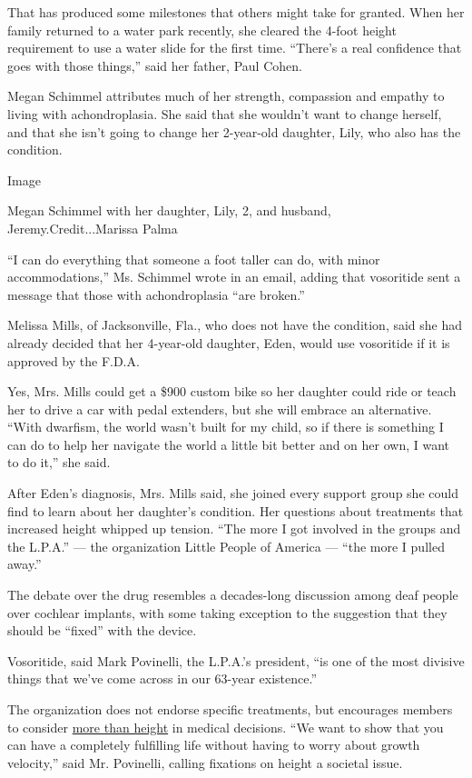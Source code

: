 That has produced some milestones that others might take for granted.
When her family returned to a water park recently, she cleared the
4-foot height requirement to use a water slide for the first time.
``There's a real confidence that goes with those things,'' said her
father, Paul Cohen.

Megan Schimmel attributes much of her strength, compassion and empathy
to living with achondroplasia. She said that she wouldn't want to change
herself, and that she isn't going to change her 2-year-old daughter,
Lily, who also has the condition.

Image

Megan Schimmel with her daughter, Lily, 2, and husband,
Jeremy.Credit...Marissa Palma

``I can do everything that someone a foot taller can do, with minor
accommodations,'' Ms. Schimmel wrote in an email, adding that vosoritide
sent a message that those with achondroplasia ``are broken.''

Melissa Mills, of Jacksonville, Fla., who does not have the condition,
said she had already decided that her 4-year-old daughter, Eden, would
use vosoritide if it is approved by the F.D.A.

Yes, Mrs. Mills could get a \$900 custom bike so her daughter could ride
or teach her to drive a car with pedal extenders, but she will embrace
an alternative. ``With dwarfism, the world wasn't built for my child, so
if there is something I can do to help her navigate the world a little
bit better and on her own, I want to do it,'' she said.

After Eden's diagnosis, Mrs. Mills said, she joined every support group
she could find to learn about her daughter's condition. Her questions
about treatments that increased height whipped up tension. ``The more I
got involved in the groups and the L.P.A.'' --- the organization Little
People of America --- ``the more I pulled away.''

The debate over the drug resembles a decades-long discussion among deaf
people over cochlear implants, with some taking exception to the
suggestion that they should be ``fixed'' with the device.

Vosoritide, said Mark Povinelli, the L.P.A.'s president, ``is one of the
most divisive things that we've come across in our 63-year existence.''

The organization does not endorse specific treatments, but encourages
members to consider
\href{https://www.lpaonline.org/genetic-biotechnology-research-position-statement}{more
than height} in medical decisions. ``We want to show that you can have a
completely fulfilling life without having to worry about growth
velocity,'' said Mr. Povinelli, calling fixations on height a societal
issue.

